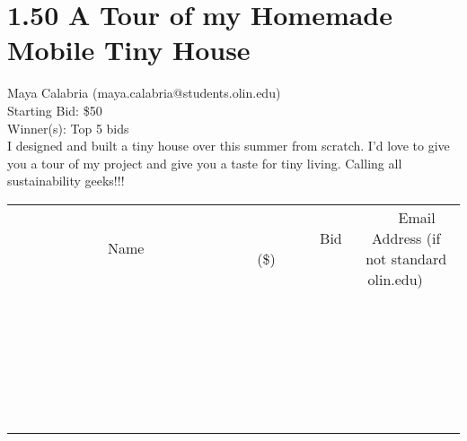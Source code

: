 \documentclass[11pt]{article}
\begin{document}
\section*{1.50 A Tour of my Homemade Mobile Tiny House}
Maya Calabria (maya.calabria@students.olin.edu) \\
Starting Bid: \$50 \\
Winner(s): 
Top 5 bids \\
I designed and built a tiny house over this summer from scratch. I'd love to give you a tour of my project and give you a taste for tiny living. Calling all sustainability geeks!!! \\[6ex]
\begin{tabular}{c c c}
~~~~~~~~~~~~~Name~~~~~~~~~~~~~ & ~~~~~~~~~Bid (\$)~~~~~~~~~ & ~~~Email Address (if not standard olin.edu)~~~ \\
 & & \\
\hline
 & & \\
\hline
 & & \\
\hline
 & & \\
\hline
 & & \\
\hline
 & & \\
\hline
 & & \\
\hline
 & & \\
\hline
 & & \\
\hline
 & & \\
\hline
 & & \\
\hline
 & & \\
\hline
 & & \\
\hline
 & & \\
\hline
 & & \\
\hline
 & & \\
\hline
 & & \\
\hline
 & & \\
\hline
 & & \\
\hline
 & & \\
\hline
 & & \\
\hline
 & & \\
\hline
 & & \\
\hline
 & & \\
\hline
 & & \\
\hline
 & & \\
\hline
\end{tabular}
\clearpage
\end{document}
